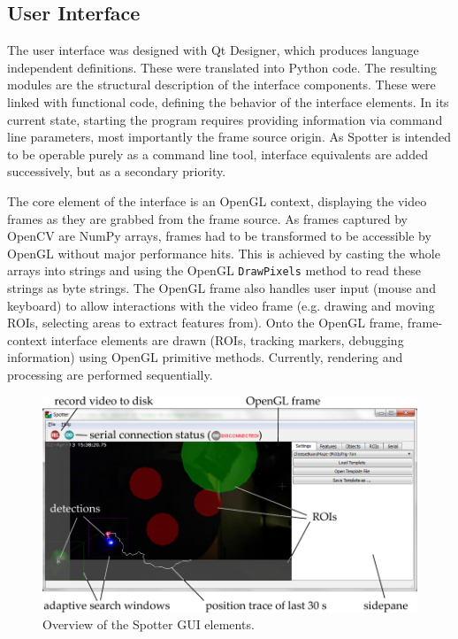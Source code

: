 \subsection{User Interface}
\label{sec:GUI}

The user interface was designed with Qt Designer, which produces language independent definitions. These were translated into Python code. The resulting modules are the structural description of the interface components. These were linked with functional code, defining the behavior of the interface elements. In its current state, starting the program requires providing information via command line parameters, most importantly the frame source origin. As Spotter is intended to be operable purely as a command line tool, interface equivalents are added successively, but as a secondary priority.

The core element of the interface is an OpenGL context, displaying the video frames as they are grabbed from the frame source. As frames captured by OpenCV are NumPy arrays, frames had to be transformed to be accessible by OpenGL without major performance hits. This is achieved by casting the whole arrays into strings and using the OpenGL \texttt{DrawPixels} method to read these strings as byte strings. The OpenGL frame also handles user input (mouse and keyboard) to allow interactions with the video frame (e.g. drawing and moving ROIs, selecting areas to extract features from). Onto the OpenGL frame, frame-context interface elements are drawn (ROIs, tracking markers, debugging information) using OpenGL primitive methods. Currently, rendering and processing are performed sequentially.


\begin{figure}%
	\centering
		\includegraphics [width=\linewidth]{gfx/GUI_overview.pdf} %
	\caption[Test]{Overview of the Spotter GUI elements.}
	\label{fig:GUI_overview}
\end{figure}

